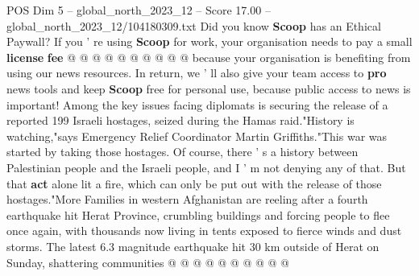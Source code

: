 \begin{textsample}{POS Dim 5 – global\_north\_2023\_12 – Score 17.00 – global\_north\_2023\_12/104180309.txt}
Did you know \textbf{Scoop} has an Ethical Paywall?
If you ' re using \textbf{Scoop} for work, your organisation needs to pay a small \textbf{license} \textbf{fee} @ @ @ @ @ @ @ @ @ @ because your organisation is benefiting from using our news resources.
In return, we ' ll also give your team access to \textbf{pro} news tools and keep \textbf{Scoop} free for personal use, because public access to news is important!
Among the key issues facing diplomats is securing the release of a reported 199 Israeli hostages, seized during the Hamas raid."History is watching,"says Emergency Relief Coordinator Martin Griffiths."This war was started by taking those hostages.
Of course, there ' s a history between Palestinian people and the Israeli people, and I ' m not denying any of that.
But that \textbf{act} alone lit a fire, which can only be put out with the release of those hostages."More Families in western Afghanistan are reeling after a fourth earthquake hit Herat Province, crumbling buildings and forcing people to flee once again, with thousands now living in tents exposed to fierce winds and dust storms.
The latest 6.3 magnitude earthquake hit 30 km outside of Herat on Sunday, shattering communities @ @ @ @ @ @ @ @ @ @

\end{textsample}
